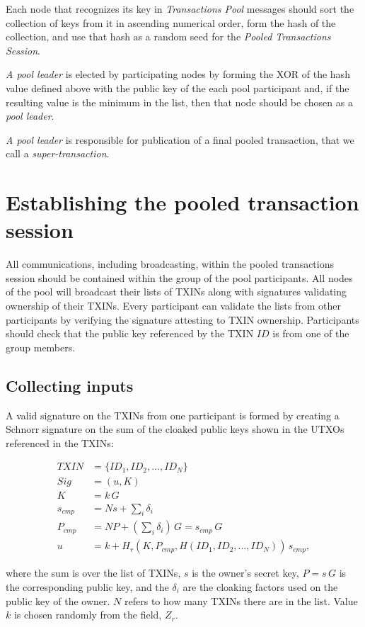 \documentclass[8pt,fleqn,openany]{book}
\begin{document}
{		Each node that recognizes its key in \textit{Transactions Pool} messages should sort the collection of keys from it in ascending numerical order, form the hash of the collection, and use that hash as a random seed for the \textit{Pooled Transactions Session}.
		
		\textit{A pool leader} is elected by participating nodes by forming the XOR of the hash value defined above with the public key of the each pool participant and, if the resulting value is the minimum in the list, then that node should be chosen as a \textit{pool leader}.
		
		\textit{A pool leader} is responsible for publication of a final pooled transaction, that we call a \textit{super-transaction}.
		
		\section{Establishing the pooled transaction session}
		All communications, including broadcasting, within the pooled transactions session should be contained within the group of the pool participants. All nodes of the pool will broadcast their lists of TXINs along with signatures validating ownership of their TXINs. Every participant can validate the lists from other participants by verifying the signature attesting to TXIN ownership. Participants should check that the public key referenced by the TXIN $ID$ is from one of the group members.
		
		\subsection{Collecting inputs} 
		A valid signature on the TXINs from one participant is formed by creating a Schnorr signature on the sum of the cloaked public keys shown in the UTXOs referenced in the TXINs:
		
		\begin{align*}
		TXIN &= \{ID_1, ID_2, ..., ID_N\}\\
		Sig &= (u, K)\\
		K &= k \, G \\
		s_{cmp} &= N s + \sum_i{\delta_i}\\
		P_{cmp} &= N P + (\sum_i{\delta_i})\, G = s_{cmp} \, G\\
		u &= k + H_r(K, P_{cmp}, H(ID_1, ID_2, ..., ID_N)) \, s_{cmp},
		\end{align*}
		
		where the sum is over the list of TXINs, $s$ is the owner’s secret key, $P = s \, G$ is the corresponding public key, and the $\delta_i$ are the cloaking factors used on the public key of the owner. $N$ refers to how many TXINs there are in the list. Value $k$ is chosen randomly from the field, $Z_r$. 
		
}
\end{document}
